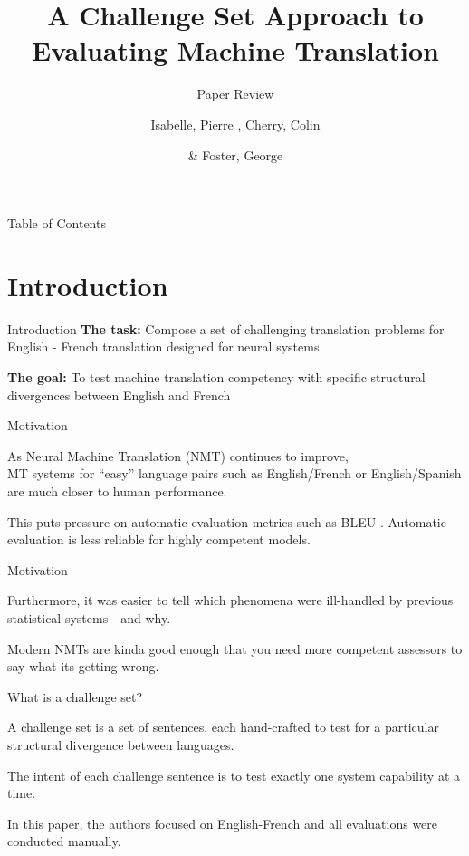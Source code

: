 \documentclass{beamer}
\title{A Challenge Set Approach to Evaluating Machine Translation}
\subtitle{Paper Review}
\author[shortname]{Isabelle, Pierre \inst{1}, Cherry, Colin \inst{1}\and\& Foster, George \inst{2}}
\institute[shortinst]{\inst{1} National Research Council Canada (NRCC) \and %
  \inst{2} Google}
\begin{document}
\maketitle


\begin{frame}{Table of Contents}
  \tableofcontents
\end{frame}

\section{Introduction}
\begin{frame}{Introduction}
  \textbf{The task:} Compose a set of challenging translation problems for English - French translation designed for neural systems

  \medskip

  \textbf{The goal:} To test machine translation competency with specific structural divergences between English and French
\end{frame}

\begin{frame}{Motivation}

  As Neural Machine Translation (NMT) continues to improve, \\ MT systems for ``easy'' language pairs such as English/French or English/Spanish are much closer to human performance.

  \medskip

  This puts pressure on automatic evaluation metrics such as BLEU \parencite{papineni2002bleu}. Automatic evaluation is less reliable for highly competent models.

\end{frame}

\begin{frame}{Motivation}

  Furthermore, it was easier to tell which phenomena were ill-handled by previous statistical systems - and why.

  \medskip

  Modern NMTs are kinda good enough that you need more competent assessors to say what its getting wrong.

\end{frame}

\begin{frame}{What is a challenge set?}

  A challenge set is a set of sentences, each hand-crafted to test for a particular structural divergence between languages.

  \medskip

  The intent of each challenge sentence is to test exactly one system capability at a time.

  \medskip

  In this paper, the authors focused on English-French and all evaluations were conducted manually.
  
\end{frame}
\end{document}
